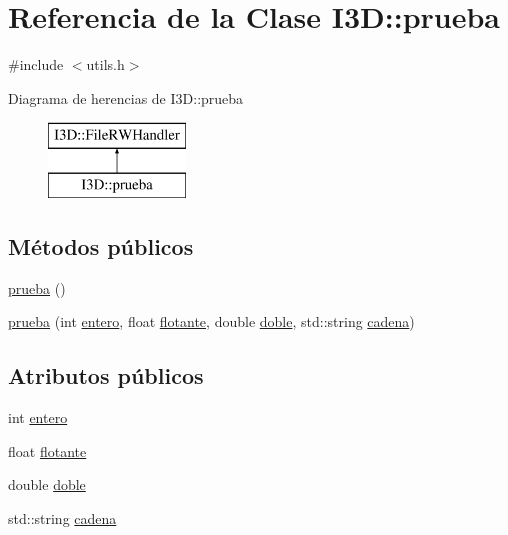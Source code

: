 \hypertarget{class_i3_d_1_1prueba}{}\section{Referencia de la Clase I3D\+:\+:prueba}
\label{class_i3_d_1_1prueba}


{\ttfamily \#include $<$utils.\+h$>$}

Diagrama de herencias de I3D\+:\+:prueba\begin{figure}[H]
\begin{center}
\leavevmode
\includegraphics[height=2.000000cm]{class_i3_d_1_1prueba}
\end{center}
\end{figure}
\subsection*{Métodos públicos}
\begin{DoxyCompactItemize}
\item 
\hyperlink{class_i3_d_1_1prueba_ac58637a65c23e52b5bbac8925026dcfc}{prueba} ()
\item 
\hyperlink{class_i3_d_1_1prueba_a1d4d01006f54cbd3f84b6711d9a4f807}{prueba} (int \hyperlink{class_i3_d_1_1prueba_ad53c6cddadb10b39cc031e6283a5df7a}{entero}, float \hyperlink{class_i3_d_1_1prueba_a62bdc26bc4e1fbf2338c57f430cb9757}{flotante}, double \hyperlink{class_i3_d_1_1prueba_a5aece7ba98b5dba226b168168f83d5cb}{doble}, std\+::string \hyperlink{class_i3_d_1_1prueba_a13577ebebc3fc5c137b906fff493dad6}{cadena})
\end{DoxyCompactItemize}
\subsection*{Atributos públicos}
\begin{DoxyCompactItemize}
\item 
int \hyperlink{class_i3_d_1_1prueba_ad53c6cddadb10b39cc031e6283a5df7a}{entero}
\item 
float \hyperlink{class_i3_d_1_1prueba_a62bdc26bc4e1fbf2338c57f430cb9757}{flotante}
\item 
double \hyperlink{class_i3_d_1_1prueba_a5aece7ba98b5dba226b168168f83d5cb}{doble}
\item 
std\+::string \hyperlink{class_i3_d_1_1prueba_a13577ebebc3fc5c137b906fff493dad6}{cadena}
\end{DoxyCompactItemize}


